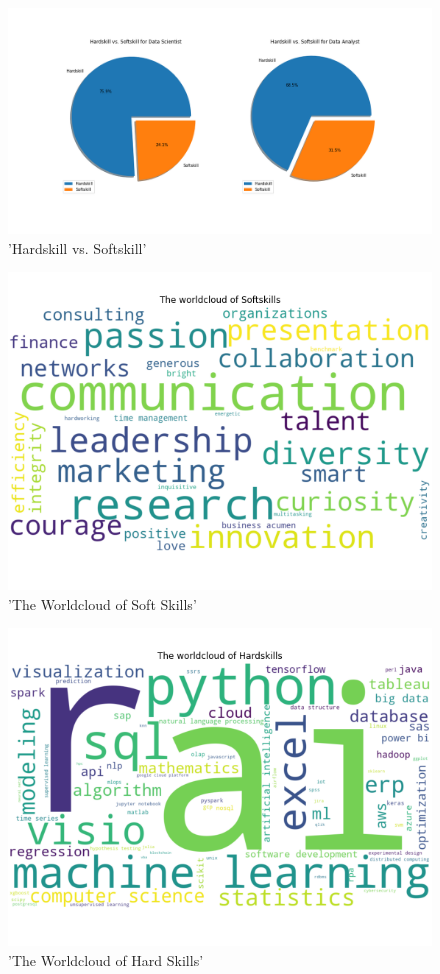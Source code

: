 \documentclass[10pt,onecolumn,letterpaper]{article}
\begin{document}
\begin{figure}[H]
  \centering
  \includegraphics[width=1\textwidth]{f3.png}
  \caption{'Hardskill vs. Softskill'}
\end{figure}

\begin{figure}[H]
  \centering
  \includegraphics[width=.75\textwidth]{f1.png}
  \caption{'The Worldcloud of Soft Skills'}
\end{figure}

\begin{figure}[H]
  \centering
  \includegraphics[width=.75\textwidth]{f4.png}
  \caption{'The Worldcloud of Hard Skills'}
\end{figure}
\end{document}
